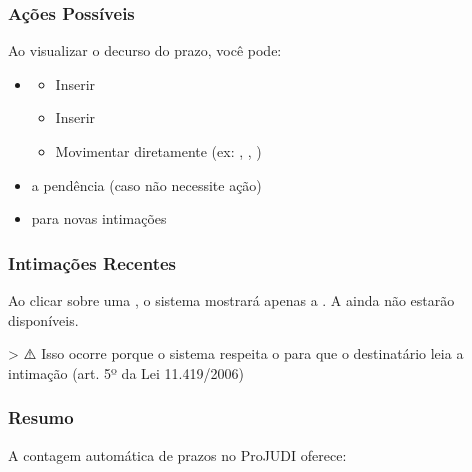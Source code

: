 \documentclass[letterpaper,10pt,brazil]{sphinxmanual}
\begin{document}
\subsubsection{Ações Possíveis}
\label{\detokenize{projud_31_contagemprazo:acoes-possiveis}}
\sphinxAtStartPar
Ao visualizar o decurso do prazo, você pode:
\begin{itemize}
\item {} \begin{description}
\begin{itemize}
\item {} 
\sphinxAtStartPar
Inserir 

\item {} 
\sphinxAtStartPar
Inserir 

\item {} 
\sphinxAtStartPar
Movimentar diretamente (ex: , , )

\end{itemize}

\end{description}

\item {} 
\sphinxAtStartPar
{} a pendência (caso não necessite ação)

\item {} 
\sphinxAtStartPar
{} para novas intimações

\end{itemize}


\subsubsection{Intimações Recentes}
\label{\detokenize{projud_31_contagemprazo:intimacoes-recentes}}
\sphinxAtStartPar
Ao clicar sobre uma , o sistema mostrará apenas a . A  ainda não estarão disponíveis.

\sphinxAtStartPar
\textgreater{} ⚠️ Isso ocorre porque o sistema respeita o  para que o destinatário leia a intimação (art. 5º da Lei 11.419/2006)


\subsubsection{Resumo}
\label{\detokenize{projud_31_contagemprazo:resumo}}
\sphinxAtStartPar
A contagem automática de prazos no ProJUDI oferece:
\end{document}
